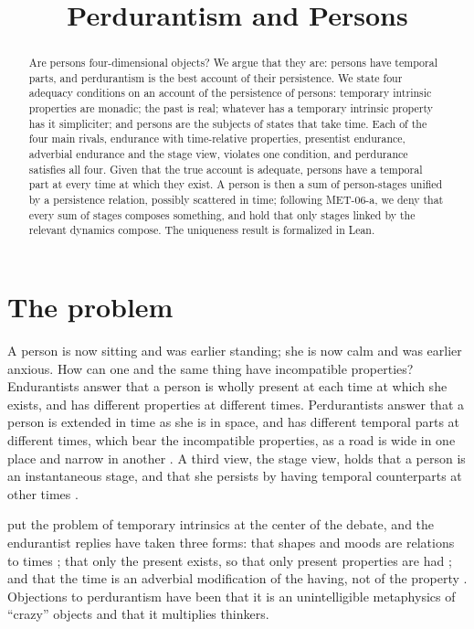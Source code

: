 \documentclass{situationist-preprint}
\title{Perdurantism and Persons}
\begin{document}
\maketitle

\begin{abstract}
Are persons four-dimensional objects? We argue that they are: persons have temporal parts, and perdurantism is the best account of their persistence. We state four adequacy conditions on an account of the persistence of persons: temporary intrinsic properties are monadic; the past is real; whatever has a temporary intrinsic property has it simpliciter; and persons are the subjects of states that take time. Each of the four main rivals, endurance with time-relative properties, presentist endurance, adverbial endurance and the stage view, violates one condition, and perdurance satisfies all four. Given that the true account is adequate, persons have a temporal part at every time at which they exist. A person is then a sum of person-stages unified by a persistence relation, possibly scattered in time; following MET-06-a, we deny that every sum of stages composes something, and hold that only stages linked by the relevant dynamics compose. The uniqueness result is formalized in Lean.
\end{abstract}

\section{The problem}

A person is now sitting and was earlier standing; she is now calm and was earlier anxious. How can one and the same thing have incompatible properties? Endurantists answer that a person is wholly present at each time at which she exists, and has different properties at different times. Perdurantists answer that a person is extended in time as she is in space, and has different temporal parts at different times, which bear the incompatible properties, as a road is wide in one place and narrow in another \citep{Quine1950,Lewis1976,Heller1990,Sider2001}. A third view, the stage view, holds that a person is an instantaneous stage, and that she persists by having temporal counterparts at other times \citep{Sider2001,Hawley2001}.

\citet[202--204]{Lewis1986} put the problem of temporary intrinsics at the center of the debate, and the endurantist replies have taken three forms: that shapes and moods are relations to times \citep{Mellor1981,vanInwagen1990}; that only the present exists, so that only present properties are had \citep{Merricks1994}; and that the time is an adverbial modification of the having, not of the property \citep{Johnston1987,Haslanger1989}. Objections to perdurantism have been that it is an unintelligible metaphysics of \enquote{crazy} objects \citep{Thomson1983} and that it multiplies thinkers.
\end{document}
